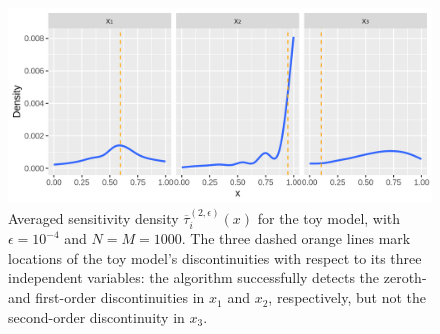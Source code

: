 \documentclass[12pt]{article}
\begin{document}
\begin{figure}
    \centering
    \includegraphics[width=1.00\linewidth]{figures/toy-taubar.png}
    \caption{Averaged sensitivity density $\overline{\tau}_i^{(2,\epsilon)}(x)$ for the toy model, with $\epsilon = 10^{-4}$ and $N = M = 1000$. The three dashed orange lines mark locations of the toy model's discontinuities with respect to its three independent variables: the algorithm successfully detects the zeroth- and first-order discontinuities in $x_1$ and $x_2$, respectively, but not the second-order discontinuity in $x_3$.}
    \label{fig:toy-taubar}
\end{figure}
\end{document}
